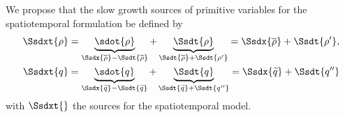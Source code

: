 {We propose that the slow growth sources of primitive variables for the
spatiotemporal formulation be defined by
%
\begin{gather}
\begin{align}
\Ssdxt{\rho}&=    \underbrace{\sdot{\rho}}_{\Ssdx{\mean{\rho}} - \Ssdt{\mean{\rho}}}
               + \underbrace{\Ssdt{\rho}  }_{\Ssdt{\mean{\rho}} + \Ssdt{\fluc{\rho}}}
            =  \Ssdx{\mean{\rho}} + \Ssdt{\fluc{\rho}}, \\
\Ssdxt{q}   &=    \underbrace{\sdot{q}}_{\Ssdx{\fav{q}} - \Ssdt{\fav{q}}}
               + \underbrace{\Ssdt{q}  }_{\Ssdt{\fav{q}} + \Ssdt{\ffluc{q}}}
            =  \Ssdx{\fav{q}}     + \Ssdt{\ffluc{q}}
\end{align}
\end{gather}
%
with $\Ssdxt{}$ the sources for the spatiotemporal model.

}
